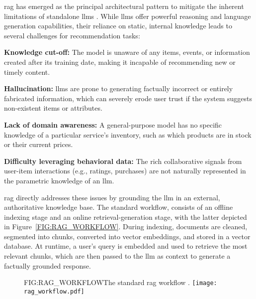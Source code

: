 \ac{rag} has emerged as the principal architectural pattern to mitigate the inherent limitations of standalone \acp{llm} \cite{SOTA-RAG-SURVEY}. While \acp{llm} offer powerful reasoning and language generation capabilities, their reliance on static, internal knowledge leads to several challenges for recommendation tasks:
\begin{compactitem}[\textbullet]
    \item \textbf{Knowledge cut-off:} The model is unaware of any items, events, or information created after its training date, making it incapable of recommending new or timely content.
    \item \textbf{Hallucination:} \acp{llm} are prone to generating factually incorrect or entirely fabricated information, which can severely erode user trust if the system suggests non-existent items or attributes.
    \item \textbf{Lack of domain awareness:} A general-purpose model has no specific knowledge of a particular service's inventory, such as which products are in stock or their current prices.
    \item \textbf{Difficulty leveraging behavioral data:} The rich collaborative signals from user-item interactions (e.g., ratings, purchases) are not naturally represented in the parametric knowledge of an \ac{llm}.
\end{compactitem}

\ac{rag} directly addresses these issues by grounding the \ac{llm} in an external, authoritative knowledge base. The standard workflow, consists of an offline indexing stage and an online retrieval-generation stage, with the latter depicted in Figure~\ref{FIG:RAG_WORKFLOW}. During indexing, documents are cleaned, segmented into chunks, converted into vector embeddings, and stored in a vector database. At runtime, a user's query is embedded and used to retrieve the most relevant chunks, which are then passed to the \ac{llm} as context to generate a factually grounded response.

\begin{figure}[RAG Workflow]{FIG:RAG_WORKFLOW}{The standard \acl{rag} workflow \cite{AWS-RAG}.}
    \texttt{[image: rag\_workflow.pdf]}
\end{figure}

